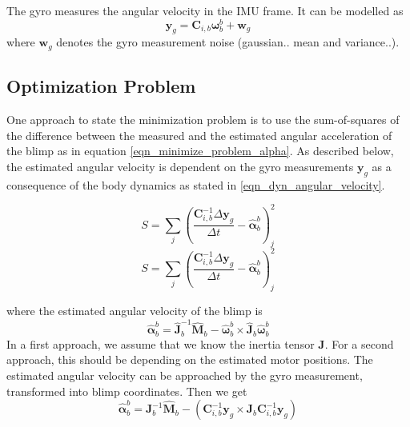The gyro measures the angular velocity in the IMU frame. It can be modelled as
\begin{equation}
\mathbf{y}_{g} = \mathbf{C}_{i,b} \boldsymbol{\omega}_b^b + \mathbf{w}_g
\end{equation}
where $\mathbf{w}_g$ denotes the gyro measurement noise (gaussian.. mean and variance..).

\subsection{Optimization Problem}
One approach to state the minimization problem is to use the sum-of-squares of the difference between the measured and the estimated angular acceleration of the blimp as in equation \eqref{eqn_minimize_problem_alpha}. As described below, the estimated angular velocity is dependent on the gyro measurements $\mathbf{y}_g$ as a consequence of the body dynamics as stated in \eqref{eqn_dyn_angular_velocity}.

\begin{equation}
\label{eqn_minimize_problem_alpha}
S = \sum_j{ \left( \frac{\mathbf{C}_{i,b}^{-1} \Delta \mathbf{y}_g}{\Delta t} - \hat{\boldsymbol{\alpha}}_b^b \right)_j^2 }
\end{equation}
\begin{equation}
\label{eqn_minimize_problem_alpha}
S = \sum_j{ \left( \frac{\mathbf{C}_{i,b}^{-1} \Delta \mathbf{y}_g}{\Delta t} - \hat{\boldsymbol{\alpha}}_b^b \right)_j^2 }
\end{equation}

where the estimated angular velocity of the blimp is
\begin{equation}
\hat{\boldsymbol{\alpha}}_b^b = \hat{\mathbf{J}}_b^{-1} \hat{\mathbf{M}}_b  - \hat{\boldsymbol{\omega}}_b^b \times \hat{\mathbf{J}}_b \hat{\boldsymbol{\omega}}_b^b
\end{equation}
In a first approach, we assume that we know the inertia tensor $\mathbf{J}$. For a second approach, this should be depending on the estimated motor positions. The estimated angular velocity can be approached by the gyro measurement, transformed into blimp coordinates. Then we get
\begin{equation}
\hat{\boldsymbol{\alpha}}_b^b = \mathbf{J}_b^{-1} \hat{\mathbf{M}}_b  - \left( \mathbf{C}_{i,b}^{-1} \mathbf{y}_g \times \mathbf{J}_b \mathbf{C}_{i,b}^{-1} \mathbf{y}_g \right)
\end{equation}

